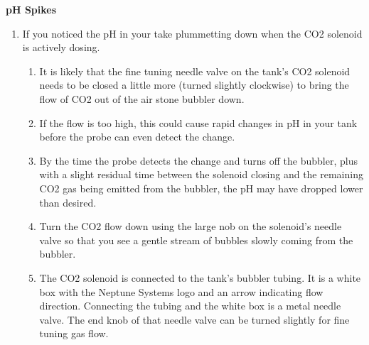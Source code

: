 \documentclass[
]{book}
\providecommand{\tightlist}{%
  \setlength{\itemsep}{0pt}\setlength{\parskip}{0pt}}
\begin{document}
\textbf{pH Spikes}

\begin{enumerate}
\def\labelenumi{\arabic{enumi}.}
\tightlist
\item
  If you noticed the pH in your take plummetting down when the CO2 solenoid is actively dosing.

  \begin{enumerate}
  \def\labelenumii{\arabic{enumii}.}
  \tightlist
  \item
    It is likely that the fine tuning needle valve on the tank's CO2 solenoid needs to be closed a little more (turned slightly clockwise) to bring the flow of CO2 out of the air stone bubbler down.
  \item
    If the flow is too high, this could cause rapid changes in pH in your tank before the probe can even detect the change.
  \item
    By the time the probe detects the change and turns off the bubbler, plus with a slight residual time between the solenoid closing and the remaining CO2 gas being emitted from the bubbler, the pH may have dropped lower than desired.
  \item
    Turn the CO2 flow down using the large nob on the solenoid's needle valve so that you see a gentle stream of bubbles slowly coming from the bubbler.
  \item
    The CO2 solenoid is connected to the tank's bubbler tubing. It is a white box with the Neptune Systems logo and an arrow indicating flow direction. Connecting the tubing and the white box is a metal needle valve. The end knob of that needle valve can be turned slightly for fine tuning gas flow.
  \end{enumerate}
\end{enumerate}

  
\end{document}
